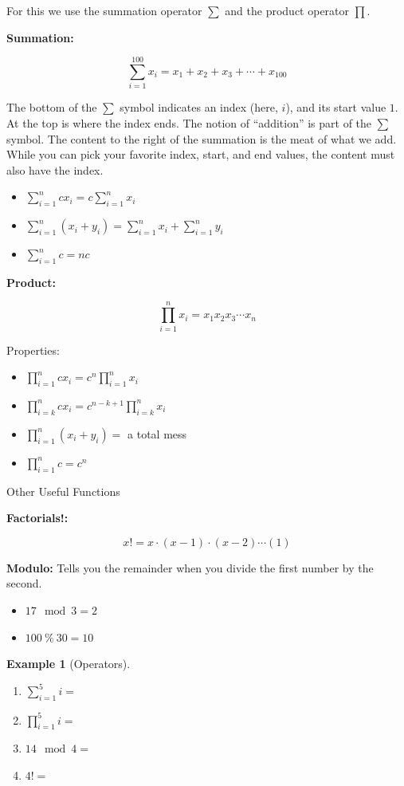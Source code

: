 \documentclass[
]{book}
\providecommand{\tightlist}{%
  \setlength{\itemsep}{0pt}\setlength{\parskip}{0pt}}
\theoremstyle{definition}
\theoremstyle{definition}
\newtheorem{example}{Example}[chapter]
\theoremstyle{definition}
\theoremstyle{definition}
\theoremstyle{remark}
\begin{document}
For this we use the summation operator \(\sum\) and the product operator \(\prod\).

\textbf{Summation:}

\[\sum\limits_{i=1}^{100} x_i = x_1+x_2+x_3+\cdots+x_{100}\]

The bottom of the \(\sum\) symbol indicates an index (here, \(i\)), and its start value \(1\). At the top is where the index ends. The notion of ``addition'' is part of the \(\sum\) symbol. The content to the right of the summation is the meat of what we add. While you can pick your favorite index, start, and end values, the content must also have the index.

\begin{itemize}
\tightlist
\item
  \(\sum\limits_{i=1}^n c x_i = c \sum\limits_{i=1}^n x_i\)
\item
  \(\sum\limits_{i=1}^n (x_i + y_i) = \sum\limits_{i=1}^n x_i + \sum\limits_{i=1}^n y_i\)
\item
  \(\sum\limits_{i=1}^n c = n c\)
\end{itemize}

\textbf{Product:}

\[\prod\limits_{i=1}^n x_i = x_1 x_2 x_3 \cdots x_n\]

Properties:

\begin{itemize}
\tightlist
\item
  \(\prod\limits_{i=1}^n c x_i = c^n \prod\limits_{i=1}^n x_i\)
\item
  \(\prod\limits_{i=k}^n c x_i = c^{n-k+1} \prod\limits_{i=k}^n x_i\)
\item
  \(\prod\limits_{i=1}^n (x_i + y_i) =\) a total mess
\item
  \(\prod\limits_{i=1}^n c = c^n\)
\end{itemize}

Other Useful Functions

\textbf{Factorials!:}

\[x! = x\cdot (x-1) \cdot (x-2) \cdots (1)\]

\textbf{Modulo:} Tells you the remainder when you divide the first number by the second.

\begin{itemize}
\tightlist
\item
  \(17 \mod 3 = 2\)
\item
  \(100 \ \% \ 30 = 10\)
\end{itemize}

\begin{example}[Operators]
\protect\hypertarget{exm:operators}{}{\label{exm:operators} {} }

\begin{enumerate}
\def\labelenumi{\arabic{enumi}.}
\item
  \(\sum\limits_{i=1}^{5} i =\)
\item
  \(\prod\limits_{i=1}^{5} i =\)
\item
  \(14 \mod 4 =\)
\item
  \(4! =\)
\end{enumerate}
\end{example}
\end{document}

